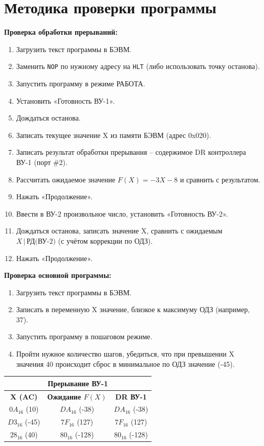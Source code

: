 \documentclass[12pt,a4paper]{article}
\begin{document}
\section*{Методика проверки программы}

\textbf{Проверка обработки прерываний:}

\begin{enumerate}
    \item Загрузить текст программы в БЭВМ.
    \item Заменить \texttt{NOP} по нужному адресу на \texttt{HLT} (либо использовать точку останова).
    \item Запустить программу в режиме РАБОТА.
    \item Установить «Готовность ВУ-1».
    \item Дождаться останова.
    \item Записать текущее значение X из памяти БЭВМ (адрес 0x020).
    \item Записать результат обработки прерывания -- содержимое DR контроллера ВУ-1 (порт \#2).
    \item Рассчитать ожидаемое значение $F(X)=-3X-8$ и сравнить с результатом.
    \item Нажать «Продолжение».
    \item Ввести в ВУ-2 произвольное число, установить «Готовность ВУ-2».
    \item Дождаться останова, записать значение X, сравнить с ожидаемым $X\,|\,\text{РД(ВУ-2)}$ (с учётом коррекции по ОДЗ).
    \item Нажать «Продолжение».
\end{enumerate}

\textbf{Проверка основной программы:}

\begin{enumerate}
    \item Загрузить текст программы в БЭВМ.
    \item Записать в переменную X значение, близкое к максимуму ОДЗ (например, 37).
    \item Запустить программу в пошаговом режиме.
    \item Пройти нужное количество шагов, убедиться, что при превышении X значения 40 происходит сброс в минимальное по ОДЗ значение (-45).
\end{enumerate}

\begin{table}[h!]
\centering
\small
\begin{tabular}{|c|c|c|}
\hline
\multicolumn{3}{|c|}{\textbf{Прерывание ВУ-1}} \\
\hline
\textbf{X (AC)} & \textbf{Ожидание $F(X)$} & \textbf{DR ВУ-1} \\
\hline
$0A_{16}$ (10) & $DA_{16}$ (-38) & $DA_{16}$ (-38) \\
$D3_{16}$ (-45) & $7F_{16}$ (127) & $7F_{16}$ (127) \\
$28_{16}$ (40) & $80_{16}$ (-128) & $80_{16}$ (-128) \\
\hline
\end{tabular}
\end{table}
\end{document}
